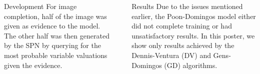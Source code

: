 \documentclass[final,hyperref={pdfpagelabels=false},notheorems]{beamer}
\newcommand{\shrink}{-15pt}
\theoremstyle{thesisstyle}
\newcommand{\pskip}{\vskip 0.5cm}
\begin{document}
\begin{frame}[t]
\begin{columns}[t]
\begin{column}{.505\textwidth}
\begin{block}{Development}
      For image completion, half of the image was given as evidence to the model. The other half
      was then generated by the SPN by querying for the most probable variable valuations given the
      evidence.
    \end{block}

  \end{column}


  \begin{column}{.02\textwidth}\end{column} %

  \begin{column}{.505\textwidth}

    \vspace{\shrink}
    \begin{block}{Results}
      Due to the issues mentioned earlier, the Poon-Domingos model either did not complete training
      or had unsatisfactory results. In this poster, we show only results achieved by the
      Dennis-Ventura (DV) and Gens-Domingos (GD) algorithms.\pskip


\end{block}
\end{column}
\end{columns}
\end{frame}
\end{document}
